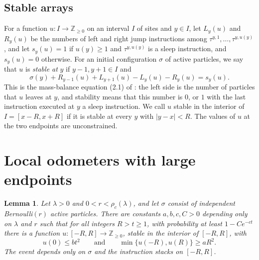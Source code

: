 \documentclass[11pt]{amsart}
\newtheorem{lemma}[theorem]{Lemma}
\theoremstyle{remark}
\newcommand{\Z}{\mathbb Z}
\begin{document}
\subsection*{Stable arrays}
For a function $u:I\to\Z_{\ge0}$ on an interval $I$ of sites and $y\in I$, let $L_y(u)$ and $R_y(u)$ be the numbers of
left and right jump instructions among $\tau^{y,1},\ldots,\tau^{y,u(y)}$, and let $s_y(u)=1$ if $u(y)\ge1$ and
$\tau^{y,u(y)}$ is a sleep instruction, and $s_y(u)=0$ otherwise. For an initial configuration $\sigma$ of active
particles, we say that $u$ is \emph{stable at} $y$ if $y-1,y+1\in I$ and
\begin{equation}\label{eq:balance}
\sigma(y)+R_{y-1}(u)+L_{y+1}(u)-L_y(u)-R_y(u)=s_y(u).
\end{equation}
This is the mass-balance equation (2.1) of \cite{JR}: the left side is the number of particles that $u$ leaves at $y$,
and stability means that this number is $0$, or $1$ with the last instruction executed at $y$ a sleep instruction. We
call $u$ stable in the interior of $I=[x-R,x+R]$ if it is stable at every $y$ with $|y-x|<R$. The values of $u$ at the
two endpoints are unconstrained.

\section{Local odometers with large endpoints}\label{sec:local}

\begin{lemma}\label{lem:local}
Let $\lambda>0$ and $0<r<\rho_c(\lambda)$, and let $\sigma$ consist of independent Bernoulli$(r)$ active particles.
There are constants $a,b,c,C>0$ depending only on $\lambda$ and $r$ such that for all integers $R>t\ge1$, with
probability at least $1-Ce^{-ct}$ there is a function $u:[-R,R]\to\Z_{\ge0}$, stable in the interior of $[-R,R]$, with
\begin{equation}\label{eq:local}
u(0)\le bt^2\qquad\text{and}\qquad \min\{u(-R),u(R)\}\ge aR^2 .
\end{equation}
The event depends only on $\sigma$ and the instruction stacks on $[-R,R]$.
\end{lemma}
\end{document}
